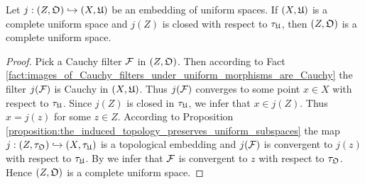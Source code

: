 \begin{theorem}\label{theorem:closed_embeddings_into_complete_space_are_complete}
Let $j:\left(Z,{\mathfrak O} \right) \hookrightarrow \left(X,{\mathfrak U}\right)$ be an embedding of uniform spaces. If $\left(X,{\mathfrak U}\right)$ is a complete uniform space and $j(Z)$ is closed with respect to $\tau_{{\mathfrak U}}$, then $\left(Z,{\mathfrak O}\right)$ is a complete uniform space.
\end{theorem}
\begin{proof}
Pick a Cauchy filter ${\mathcal F}$ in $\left(Z,{\mathfrak O}\right)$. Then according to Fact \ref{fact:images_of_Cauchy_filters_under_uniform_morphisms_are_Cauchy} the filter $j({\mathcal F})$ is Cauchy in $\left(X,{\mathfrak U}\right)$. Thus $j({\mathcal F})$ converges to some point $x\in X$ with respect to $\tau_{{\mathfrak U}}$. Since $j(Z)$ is closed in $\tau_{{\mathfrak U}}$, we infer that $x \in j(Z)$. Thus $x = j(z)$ for some $z\in Z$. According to Proposition \ref{proposition:the_induced_topology_preserves_uniform_subspaces} the map $j:\left(Z,\tau_{{\mathfrak O}}\right) \hookrightarrow \left(X,\tau_{{\mathfrak U}}\right)$ is a topological embedding and $j({\mathcal F})$ is convergent to $j(z)$ with respect to $\tau_{{\mathfrak U}}$. By {\cite[Proposition 3.3]{Filters_in_topology}} we infer that ${\mathcal F}$ is convergent to $z$ with respect to $\tau_{{\mathfrak O}}$. Hence $\left(Z,{\mathfrak O}\right)$ is a complete uniform space.
\end{proof}

